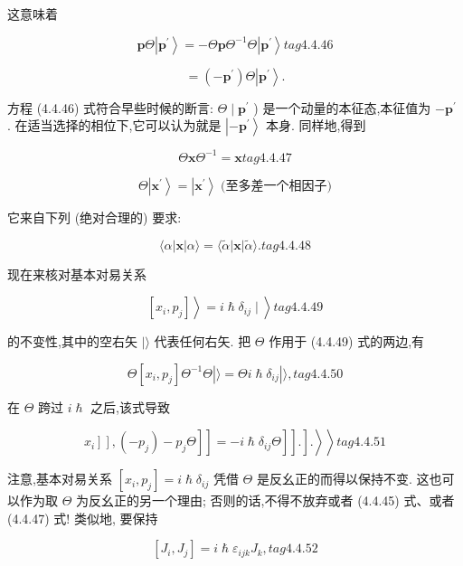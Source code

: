 这意味着

$$
\mathbf{p}\Theta \left| {\mathbf{p}}^{\prime }\right\rangle = - \Theta \mathbf{p}{\Theta }^{-1}\Theta \left| {\mathbf{p}}^{\prime }\right\rangle tag{4.4.46}
$$

$$
= \left( {-{\mathbf{p}}^{\prime }}\right) \Theta \left| {\mathbf{p}}^{\prime }\right\rangle \text{.}
$$

方程 (4.4.46) 式符合早些时候的断言: $\Theta \mid {\mathbf{p}}^{\prime }$ ) 是一个动量的本征态,本征值为 $- {\mathbf{p}}^{\prime }$ . 在适当选择的相位下,它可以认为就是 $\left| {-{\mathbf{p}}^{\prime }}\right\rangle$ 本身. 同样地,得到

$$
\Theta \mathbf{x}{\Theta }^{-1} = \mathbf{x} tag{4.4.47}
$$

$$
\Theta \left| {\mathbf{x}}^{\prime }\right\rangle = \left| {\mathbf{x}}^{\prime }\right\rangle \;\text{(至多差一个相因子)}
$$

它来自下列 (绝对合理的) 要求:

$$
\langle \alpha \left| \mathbf{x}\right| \alpha \rangle = \langle \widetilde{\alpha }\left| \mathbf{x}\right| \widetilde{\alpha }\rangle . tag{4. 4.48}
$$

现在来核对基本对易关系

$$
\left. {\left. \left\lbrack {{x}_{i},{p}_{j}}\right\rbrack \right\rangle = i\hslash {\delta }_{ij} \mid }\right\rangle tag{4.4.49}
$$

的不变性,其中的空右矢 $|\rangle$ 代表任何右矢. 把 $\Theta$ 作用于 (4.4.49) 式的两边,有

$$
\Theta \left\lbrack {{x}_{i},{p}_{j}}\right\rbrack {\Theta }^{-1}\Theta \left| {\rangle = {\Theta i}\hslash {\delta }_{ij}}\right| \rangle , tag{4. 4.50}
$$

在 $\Theta$ 跨过 $i\hslash$ 之后,该式导致

$$
\left. \left. {\left. {\left. \left. {\left. \left. {\left. \left. {x}_{i}\right\rbrack \right\rbrack ,\left( {-{p}_{j}}\right) - {p}_{j}\Theta }\right\rbrack \right\rbrack = - i\hslash {\delta }_{ij}\Theta }\right\rbrack \right\rbrack .}\right\rbrack .}\right\rangle \right\rangle tag{4. 4.51}
$$

注意,基本对易关系 $\left\lbrack {{x}_{i},{p}_{j}}\right\rbrack = i\hslash {\delta }_{ij}$ 凭借 $\Theta$ 是反幺正的而得以保持不变. 这也可以作为取 $\Theta$ 为反幺正的另一个理由; 否则的话,不得不放弃或者 (4.4.45) 式、或者 (4.4.47) 式! 类似地, 要保持

$$
\left\lbrack {{J}_{i},{J}_{j}}\right\rbrack = i\hslash {\varepsilon }_{ijk}{J}_{k}, tag{4. 4.52}
$$

